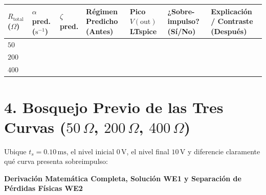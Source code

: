\documentclass[11pt, a4paper]{article}
\begin{document}
\vspace{0.2cm}
{\small
\setlength{\tabcolsep}{4pt}
\renewcommand{\arraystretch}{1.65}
\noindent
\begin{tabularx}{\textwidth}{
  >{\centering\arraybackslash\hsize=0.65\hsize}X
  >{\centering\arraybackslash\hsize=0.75\hsize}X
  >{\centering\arraybackslash\hsize=0.65\hsize}X
  >{\RaggedRight\arraybackslash\hsize=1.15\hsize}X
  >{\centering\arraybackslash\hsize=0.90\hsize}X
  >{\centering\arraybackslash\hsize=0.80\hsize}X
  >{\RaggedRight\arraybackslash\hsize=1.10\hsize}X}
\toprule
\textbf{$R_{\text{total}}$ ($\Omega$)} & \textbf{$\alpha$ pred. ($\text{s}^{-1}$)} & \textbf{$\zeta$ pred.} & \textbf{Régimen Predicho (Antes)} & \textbf{Pico $V(\text{out})$ LTspice} & \textbf{¿Sobre-impulso? (Sí/No)} & \textbf{Explicación / Contraste (Después)} \\
\midrule
$50$  & & & & & & \\[0.35cm]
$200$ & & & & & & \\[0.35cm]
$400$ & & & & & & \\[0.35cm]
\bottomrule
\end{tabularx}
}

\vspace{0.3cm}
\section*{4. Bosquejo Previo de las Tres Curvas ($50\,\Omega$, $200\,\Omega$, $400\,\Omega$)}
\noindent Ubique $t_s = 0.10\,\text{ms}$, el nivel inicial $0\,\text{V}$, el nivel final $10\,\text{V}$ y diferencie claramente qué curva presenta sobreimpulso:

\vspace{0.2cm}
\begin{center}
\end{center}

\newpage
\begin{tcolorbox}[colback=warnred!5!white, colframe=warnred, title=\textbf{CLAVE DOCENTE EXCLUSIVA — NO DISTRIBUIR EN LA HOJA DEL ESTUDIANTE}]
    \centering \textbf{Derivación Matemática Completa, Solución WE1 y Separación de Pérdidas Físicas WE2}
\end{tcolorbox}
\end{document}
